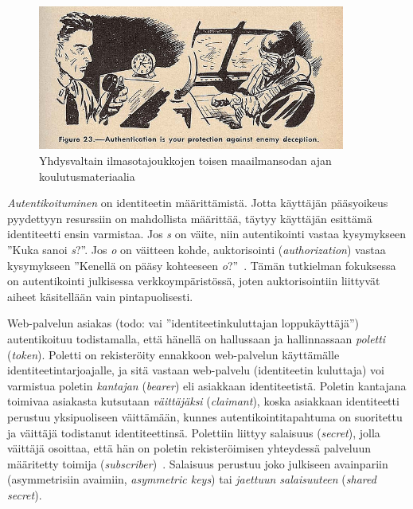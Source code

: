 \documentclass[finnish,gradu]{tktltiki}
\begin{document}
  \begin{figure}[h!]
    \centering
    \includegraphics[width=0.9\textwidth]{images/usnavy_authentication.jpg}
    \caption{Yhdysvaltain ilmasotajoukkojen toisen maailmansodan ajan koulutusmateriaalia~\cite{usnavy_authentication}}
    \label{fig:autentikointi_suojaa_viholliselta}
  \end{figure}


  \emph{Autentikoituminen} on identiteetin määrittämistä. Jotta käyttäjän pääsyoikeus pyydettyyn resurssiin on mahdollista määrittää, täytyy käyttäjän esittämä identiteetti ensin varmistaa. Jos \emph{s} on väite, niin autentikointi vastaa kysymykseen ''Kuka sanoi \emph{s}?''. Jos \emph{o} on väitteen kohde, auktorisointi (\emph{authorization}) vastaa kysymykseen ''Kenellä on pääsy kohteeseen \emph{o}?''~\cite{lampson_distributed_1992}. Tämän tutkielman fokuksessa on autentikointi julkisessa verkkoympäristössä, joten auktorisointiin liittyvät aiheet käsitellään vain pintapuolisesti.


  Web-palvelun asiakas (todo: vai ''identiteetinkuluttajan loppukäyttäjä'') autentikoituu todistamalla, että hänellä on hallussaan ja hallinnassaan \emph{poletti} (\emph{token}). Poletti on rekisteröity ennakkoon web-palvelun käyttämälle identiteetintarjoajalle, ja sitä vastaan web-palvelu (identiteetin kuluttaja) voi varmistua poletin \emph{kantajan} (\emph{bearer}) eli asiakkaan identiteetistä. Poletin kantajana toimivaa asiakasta kutsutaan \emph{väittäjäksi} (\emph{claimant}), koska asiakkaan identiteetti perustuu yksipuoliseen väittämään, kunnes autentikointitapahtuma on suoritettu ja väittäjä todistanut identiteettinsä. Polettiin liittyy salaisuus (\emph{secret}), jolla väittäjä osoittaa, että hän on poletin rekisteröimisen yhteydessä palveluun määritetty toimija (\emph{subscriber})~\cite{NIST_SP800-63-1}. Salaisuus perustuu joko julkiseen avainpariin (asymmetrisiin avaimiin, \emph{asymmetric keys}) tai \emph{jaettuun salaisuuteen} (\emph{shared secret}).
\end{document}
